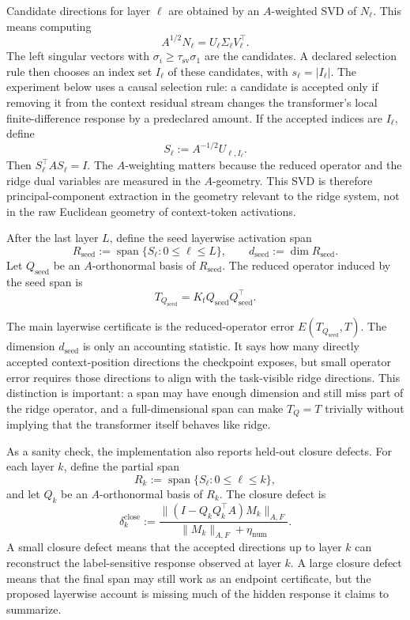 \documentclass[11pt]{article}
\newcommand{\spanop}{\operatorname{span}}
\begin{document}
Candidate directions for layer \(\ell\) are obtained by an \(A\)-weighted SVD of \(N_\ell\). This means
computing
\[
A^{1/2}N_\ell=U_\ell\Sigma_\ell V_\ell^\top.
\]
The left singular vectors with \(\sigma_i\ge \tau_{\mathrm{sv}}\sigma_1\) are the candidates. A declared
selection rule then chooses an index set \(I_\ell\) of these candidates, with \(s_\ell=|I_\ell|\). The
experiment below uses a causal selection rule: a candidate is accepted only if removing it from the
context residual stream changes the transformer's local finite-difference response by a predeclared
amount. If the accepted indices are \(I_\ell\), define
\[
S_\ell:=A^{-1/2}U_{\ell,I_\ell}.
\]
Then \(S_\ell^\top AS_\ell=I\). The \(A\)-weighting matters because the reduced operator and the
ridge dual variables are measured in the \(A\)-geometry. This SVD is therefore principal-component
extraction in the geometry relevant to the ridge system, not in the raw Euclidean geometry of
context-token activations.

After the last layer \(L\), define the seed layerwise activation span
\[
R_{\mathrm{seed}}
:=
\spanop\{S_\ell:0\le \ell\le L\},
\qquad
d_{\mathrm{seed}}:=\dim R_{\mathrm{seed}}.
\]
Let \(Q_{\mathrm{seed}}\) be an \(A\)-orthonormal basis of \(R_{\mathrm{seed}}\). The reduced operator induced by
the seed span is
\[
T_{Q_{\mathrm{seed}}}=K_tQ_{\mathrm{seed}}Q_{\mathrm{seed}}^\top.
\]

The main layerwise certificate is the reduced-operator error \(E(T_{Q_{\mathrm{seed}}},T)\). The
dimension \(d_{\mathrm{seed}}\) is only an accounting statistic. It says how many directly accepted
context-position directions the checkpoint exposes, but small operator error requires those
directions to align with the task-visible ridge directions. This distinction is important: a span may
have enough dimension and still miss part of the ridge operator, and a full-dimensional span can
make \(T_Q=T\) trivially without implying that the transformer itself behaves like ridge.

As a sanity check, the implementation also reports held-out closure defects. For each layer \(k\),
define the partial span
\[
R_k:=\spanop\{S_\ell:0\le \ell\le k\},
\]
and let \(Q_k\) be an \(A\)-orthonormal basis of \(R_k\). The closure defect is
\[
\delta_k^{\mathrm{close}}
:=
\frac{
\|(I-Q_kQ_k^\top A)M_k\|_{A,F}
}{
\|M_k\|_{A,F}+\eta_{\mathrm{num}}
}.
\]
A small closure defect means that the accepted directions up to layer \(k\) can reconstruct the
label-sensitive response observed at layer \(k\). A large closure defect means that the final span
may still work as an endpoint certificate, but the proposed layerwise account is missing much of
the hidden response it claims to summarize.
\end{document}
